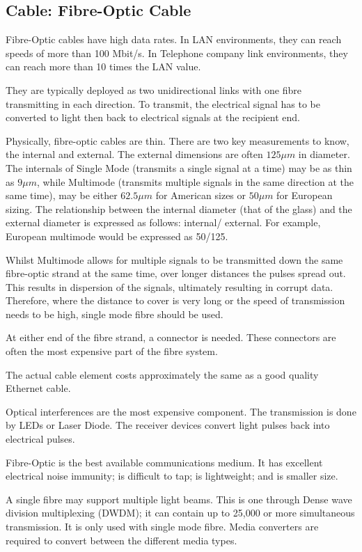 \subsection*{Cable: Fibre-Optic Cable}
Fibre-Optic cables have high data rates. In LAN environments, they can reach speeds of more than 100 Mbit/s. In Telephone company link environments, they can reach more than 10 times the LAN value.

They are typically deployed as two unidirectional links with one fibre transmitting in each direction. To transmit, the electrical signal has to be converted to light then back to electrical signals at the recipient end. 

Physically, fibre-optic cables are thin. There are two key measurements to know, the internal and external. The external dimensions are often $125 \mu m$ in diameter. The internals of Single Mode (transmits a single signal at a time) may be as thin as $9 \mu m$, while Multimode (transmits multiple signals in the same direction at the same time), may be either $62.5 \mu m$ for American sizes or $50 \mu m$ for European sizing. The relationship between the internal diameter (that of the glass) and the external diameter is expressed as follows: internal/ external. For example, European multimode would be expressed as 50/125.

Whilst Multimode allows for multiple signals to be transmitted down the same fibre-optic strand at the same time, over longer distances the pulses spread out. This results in dispersion of the signals, ultimately resulting in corrupt data. Therefore, where the distance to cover is very long or the speed of transmission needs to be high, single mode fibre should be used.

At either end of the fibre strand, a connector is needed. These connectors are often the most expensive part of the fibre system.

The actual cable element costs approximately the same as a good quality Ethernet cable.

Optical interferences are the most expensive component. The transmission is done by LEDs or Laser Diode. The receiver devices convert light pulses back into electrical pulses.

Fibre-Optic is the best available communications medium. It has excellent electrical noise immunity; is difficult to tap; is lightweight; and is smaller size.

A single fibre may support multiple light beams. This is one through Dense wave division multiplexing (DWDM); it can contain up to 25,000 or more simultaneous transmission. It is only used with single mode fibre. Media converters are required to convert between the different media types.

